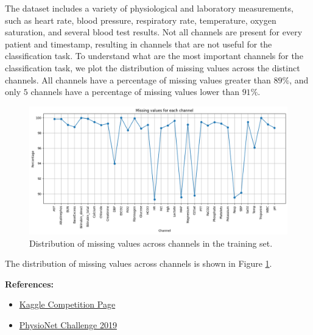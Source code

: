\documentclass[a4paper,11pt]{article}
\begin{document}
The dataset includes a variety of physiological and laboratory measurements, such as heart rate, blood pressure, respiratory rate, temperature, oxygen saturation, and several blood test results.
Not all channels are present for every patient and timestamp, resulting in channels that are not useful for the classification task.
To understand what are the most important channels for the classification task, we plot the distribution of missing values across the distinct channels.
All channels have a percentage of missing values greater than $89\%$, and only $5$ channels have a percentage of missing values lower than $91\%$.
\begin{figure}[htbp]
\centering
\includegraphics[width=1.0\textwidth]{imgs/missing_values_channels.png}
\caption{Distribution of missing values across channels in the training set.}
\label{fig:missing_values_channels}
\end{figure}
The distribution of missing values across channels is shown in Figure \ref{fig:missing_values_channels}.

\textbf{References:}
\begin{itemize}
    \item \href{https://www.kaggle.com/competitions/2025-predictive-models-for-time-series-analysis}{Kaggle Competition Page}
    \item \href{https://physionet.org/content/challenge-2019/1.0.0/}{PhysioNet Challenge 2019}
\end{itemize}
\end{document}
